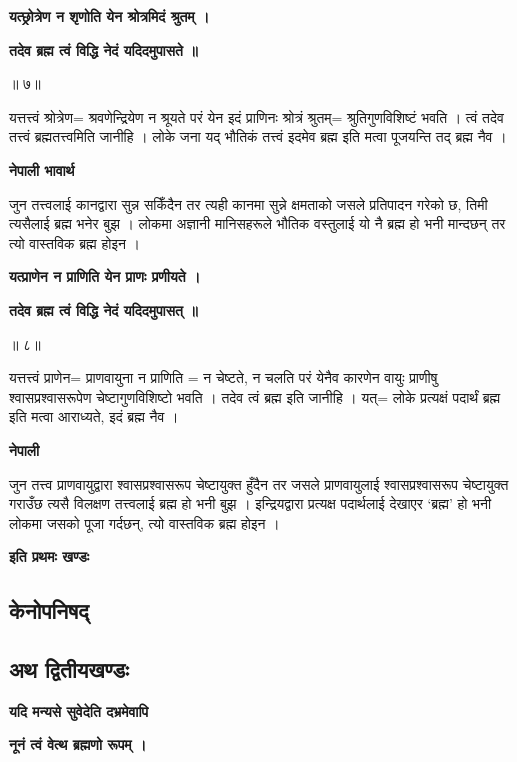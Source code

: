 \documentclass[11pt, a5paper]{article}
\begin{document}
\textbf{यत्छ्रोत्रेण न शृणोति येन श्रोत्रमिदं श्रुतम् ।}

\textbf{तदेव ब्रह्म त्वं विद्धि नेदं यदिदमुपासते ॥}

॥ ७॥

यत्तत्त्वं श्रोत्रेण= श्रवणेन्द्रियेण न श्रूयते परं येन इदं प्राणिनः श्रोत्रं श्रुतम्= श्रुतिगुणविशिष्टं भवति । त्वं तदेव तत्त्वं ब्रह्मतत्त्वमिति जानीहि । लोके जना यद् भौतिकं तत्त्वं इदमेव ब्रह्म इति मत्वा पूजयन्ति तद् ब्रह्म नैव ।

\textbf{नेपाली भावार्थ}

जुन तत्त्वलाई कानद्वारा सुन्न सकिँदैन तर त्यही कानमा सुन्ने क्षमताको जसले प्रतिपादन गरेको छ, तिमी त्यसैलाई ब्रह्म भनेर बुझ । लोकमा अज्ञानी मानिसहरूले भौतिक वस्तुलाई यो नै ब्रह्म हो भनी मान्दछन् तर त्यो वास्तविक ब्रह्म होइन ।

\textbf{यत्प्राणेन न प्राणिति येन प्राणः प्रणीयते ।}

\textbf{तदेव ब्रह्म त्वं विद्धि नेदं यदिदमुपासत् ॥}

॥ ८॥

यत्तत्त्वं प्राणेन= प्राणवायुना न प्राणिति = न चेष्टते, न चलति परं येनैव कारणेन वायुः प्राणीषु श्वासप्रश्वासरूपेण चेष्टागुणविशिष्टो भवति  । तदेव त्वं ब्रह्म इति जानीहि । यत्= लोके प्रत्यक्षं पदार्थं ब्रह्म इति मत्वा आराध्यते, इदं ब्रह्म नैव ।

\textbf{नेपाली}

जुन तत्त्व प्राणवायुद्वारा श्वासप्रश्वासरूप चेष्टायुक्त हुँदैन तर जसले प्राणवायुलाई श्वासप्रश्वासरूप चेष्टायुक्त गराउँछ त्यसै विलक्षण तत्त्वलाई ब्रह्म हो भनी बुझ । इन्द्रियद्वारा प्रत्यक्ष पदार्थलाई देखाएर ‘ब्रह्म’ हो भनी लोकमा जसको पूजा गर्दछन्, त्यो वास्तविक ब्रह्म होइन ।

\textbf{इति प्रथमः खण्डः}

\subsection{}

\subsection{\textbf{केनोपनिषद्}}

\subsection{\textbf{अथ द्वितीयखण्डः}}

\textbf{यदि मन्यसे सुवेदेति दभ्रमेवापि}

\textbf{नूनं त्वं वेत्थ ब्रह्मणो रूपम् ।}
\end{document}
